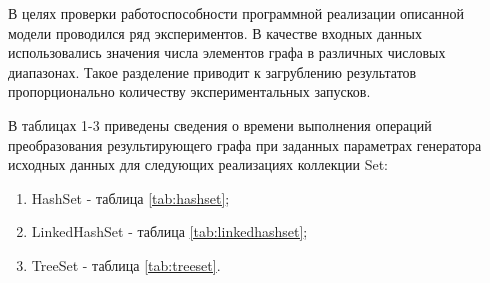 

В целях проверки работоспособности программной реализации описанной модели проводился ряд экспериментов. В качестве входных данных использовались значения числа элементов графа в различных числовых диапазонах. Такое разделение приводит к загрублению результатов пропорционально количеству экспериментальных запусков.

В таблицах 1-3 приведены сведения о времени выполнения операций преобразования результирующего графа при заданных параметрах генератора исходных данных для следующих реализациях коллекции Set:
\begin{enumerate}
    \item HashSet - таблица \ref{tab:hashset};
    \item LinkedHashSet - таблица \ref{tab:linkedhashset};
    \item TreeSet - таблица \ref{tab:treeset}.
\end{enumerate}

